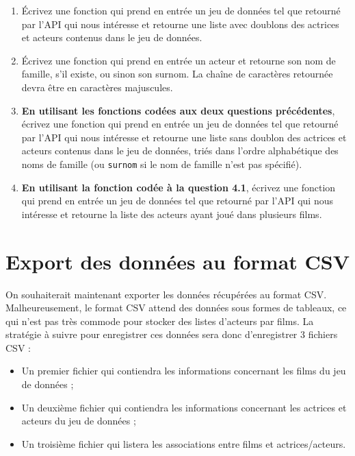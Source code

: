 \documentclass[11pt,a4paper]{article}
\begin{document}
\begin{enumerate}
    \item Écrivez une fonction qui prend en entrée un jeu de données tel que retourné par l'API qui nous intéresse et retourne une liste avec doublons des actrices et acteurs contenus dans le jeu de données.
    
    \item Écrivez une fonction qui prend en entrée un acteur et retourne son nom de famille, s'il existe, ou sinon son surnom. La chaîne de caractères retournée devra être en caractères majuscules.
    
    \item \textbf{En utilisant les fonctions codées aux deux questions précédentes}, écrivez une fonction qui prend en entrée un jeu de données tel que retourné par l'API qui nous intéresse et retourne une liste sans doublon des actrices et acteurs contenus dans le jeu de données, triés dans l'ordre alphabétique des noms de famille (ou \verb+surnom+ si le nom de famille n'est pas spécifié).
    
    \item \textbf{En utilisant la fonction codée à la question 4.1}, écrivez une fonction qui prend en entrée un jeu de données tel que retourné par l'API qui nous intéresse et retourne la liste des acteurs ayant joué dans plusieurs films.
\end{enumerate}

\section{Export des données au format CSV}

On souhaiterait maintenant exporter les données récupérées au format CSV.
Malheureusement, le format CSV attend des données sous formes de tableaux, ce qui n'est pas très commode pour stocker des listes d'acteurs par films.
La stratégie à suivre pour enregistrer ces données sera donc d'enregistrer 3 fichiers CSV :
\begin{itemize}
    \item Un premier fichier qui contiendra les informations concernant les films du jeu de données ;
    \item Un deuxième fichier qui contiendra les informations concernant les actrices et acteurs du jeu de données ;
    \item Un troisième fichier qui listera les associations entre films et actrices/acteurs.
\end{itemize}
\end{document}
